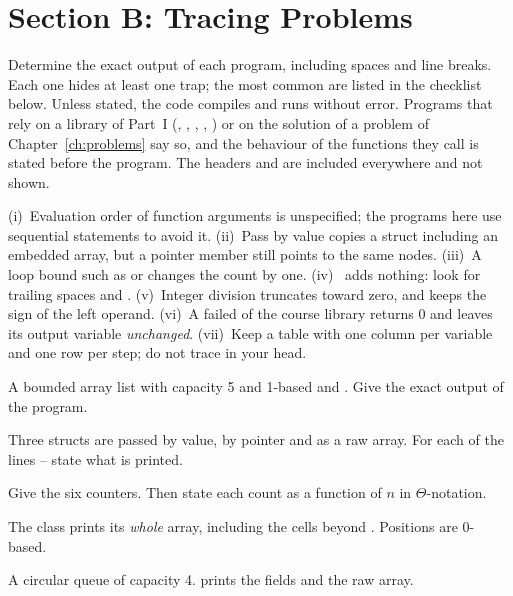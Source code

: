 \chapter{Section B: Tracing Problems}\label{ch:tracing}

Determine the exact output of each program, including spaces and line breaks. Each one
hides at least one trap; the most common are listed in the checklist below. Unless
stated, the code compiles and runs without error. Programs that rely on a library of
Part~I (, , , , ) or on
the solution of a problem of Chapter~\ref{ch:problems} say so, and the behaviour of the
functions they call is stated before the program. The headers  and
 are included everywhere and not shown.

 (i)~Evaluation order of function arguments is unspecified; the
programs here use sequential statements to avoid it. (ii)~Pass by value copies a struct
including an embedded array, but a pointer member still points to the same nodes.
(iii)~A loop bound such as  or  changes the count by one.
(iv)~ adds nothing: look for trailing spaces and .
(v)~Integer division truncates toward zero, and \cc{\%} keeps the sign of the left
operand. (vi)~A failed  of the course library returns 0 and leaves its output
variable \emph{unchanged}. (vii)~Keep a table with one column per variable and one row
per step; do not trace in your head.

A bounded array list with capacity 5 and 1-based  and . Give the
exact output of the program.

Three structs are passed by value, by pointer and as a raw array. For each of the lines
-- state what is printed.

Give the six counters. Then state each count as a function of $n$ in $\Theta$-notation.

The class prints its \emph{whole} array, including the cells beyond . Positions
are 0-based.

A circular queue of capacity 4.  prints the fields and the raw array.

